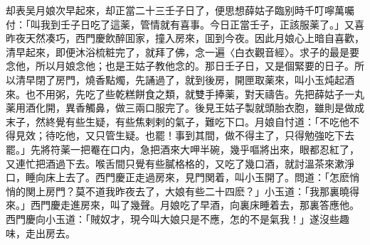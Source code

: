却表吴月娘次早起來，却正當二十三壬子日了，便思想薛姑子臨别時千叮嚀萬囑付：「叫我到壬子日吃了這薬，管情就有喜事。今日正當壬子，正該服薬了。」又喜昨夜天然凑巧，西門慶飲醉囬家，撞入房來，囬到今夜。因此月娘心上暗自喜歡，清早起來，即便沐浴梳粧完了，就拜了佛，念一遍〈白衣觀音經〉。求子的最是要念他，所以月娘念他；也是王姑子教他念的。那日壬子日，又是個緊要的日子。所以清早閉了房門，燒香點燭，先誦過了，就到後房，開匣取薬來，叫小玉炖起酒來。也不用粥，先吃了些乾糕餅食之類，就雙手捧薬，對天禱告。先把薛姑子一丸薬用酒化開，異香觸鼻，做三兩口服完了。後見王姑子製就頭胎衣胞，雖則是做成末子，然終覺有些生疑，有些焦剌剌的氣子，難吃下口。月娘自忖道：「不吃他不得見效；待吃他，又只管生疑。也罷！事到其間，做不得主了，只得勉強吃下去罷。」先將符薬一把罨在口内，急把酒來大呷半碗，幾乎嘔將出來，眼都忍紅了，又連忙把酒過下去。喉舌間只覺有些膩格格的，又吃了幾口酒，就討溫茶來漱淨口，睡向床上去了。西門慶正走過房來，見門関着，叫小玉開了。問道：「怎麽悄悄的関上房門？莫不道我昨夜去了，大娘有些二十四麽？」小玉道：「我那裏曉得來。」西門慶走進房來，叫了幾聲。月娘吃了早酒，向裏床睡着去，那裏答應他。西門慶向小玉道：「賊奴才，現今叫大娘只是不應，怎的不是氣我！」遂沒些趣味，走出房去。


